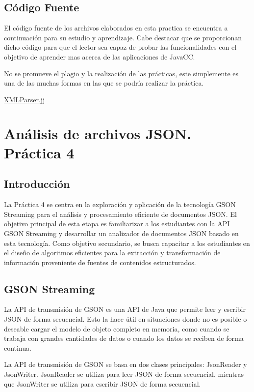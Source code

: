 \subsection{Código Fuente}

\noindent El código fuente de los archivos elaborados en esta practica se encuentra a continuación para su estudio y aprendizaje. Cabe destacar que se proporcionan dicho código para que el lector sea capaz de probar las funcionalidades con el objetivo de aprender mas acerca de las aplicaciones de JavaCC.

No se promueve el plagio y la realización de las prácticas, este simplemente es una de las muchas formas en las que se podría realizar la práctica.

\hyperref[sec:XMLParser]{XMLParser.jj}

\section{Análisis de archivos JSON. Práctica 4}

\subsection{Introducción}

\noindent La Práctica 4 se centra en la exploración y aplicación de la tecnología GSON Streaming para el análisis y procesamiento eficiente de documentos JSON. El objetivo principal de esta etapa es familiarizar a los estudiantes con la API GSON Streaming y desarrollar un analizador de documentos JSON basado en esta tecnología. Como objetivo secundario, se busca capacitar a los estudiantes en el diseño de algoritmos eficientes para la extracción y transformación de información proveniente de fuentes de contenidos estructurados.

\subsection{GSON Streaming}

\noindent La API de transmisión de GSON es una API de Java que permite leer y escribir JSON de forma secuencial. Esto la hace útil en situaciones donde no es posible o deseable cargar el modelo de objeto completo en memoria, como cuando se trabaja con grandes cantidades de datos o cuando los datos se reciben de forma continua.

La API de transmisión de GSON se basa en dos clases principales: JsonReader y JsonWriter. JsonReader se utiliza para leer JSON de forma secuencial, mientras que JsonWriter se utiliza para escribir JSON de forma secuencial.

